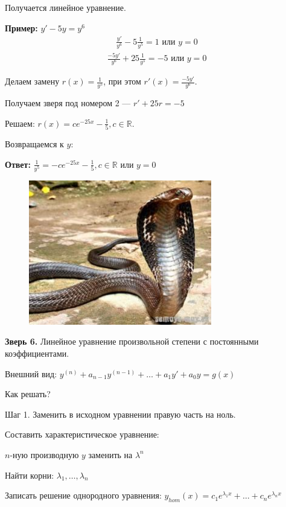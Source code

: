 \documentclass[10pt,a4paper]{article}
\begin{document}
\par Получается линейное уравнение.
\par \textbf{Пример:} $y' - 5y = y^6$
\begin{eqnarray*}
\frac{y'}{y^6} - 5 \frac{1}{y^5} = 1 \text{ или } y = 0
\end{eqnarray*}
\begin{eqnarray*}
\frac{-5y'}{y^6} + 25 \frac{1}{y^5} = -5 \text{ или } y = 0
\end{eqnarray*}
\par Делаем замену $r(x) = \frac1 {y^5}$, при этом $r'(x) = \frac{-5y'}{y^6}$.
\par Получаем зверя под номером 2 --- $r' + 25r = -5$
\par Решаем: $r(x) = ce^{-25x} - \frac 1 5, c \in \mathbb{R}$.
\par Возвращаемся к $y$:
\par \textbf{Ответ:} $\frac 1 {y^5} = -ce^{-25x} - \frac 1 5, c \in \mathbb{R} \text{ или } y = 0$ \\
\newpage
\pagecolor{LimeGreen}
\begin{figure}[h]
\centering
\includegraphics[width = 8cm]{snake.jpg}
\end{figure}
\par \textbf{Зверь 6.} Линейное уравнение произвольной степени с постоянными коэффициентами.
\par Внешний вид: $y^{(n)} + a_{n-1}y^{(n-1)} + \dots + a_1y' + a_0y = g(x)$
\par Как решать?
\par Шаг 1. Заменить в исходном уравнении правую часть на ноль.
\par Составить характеристическое уравнение:
\par $n$-ную производную $y$ заменить на $\lambda^n$
\par Найти корни: $\lambda_1, \dots, \lambda_n$
\par Записать решение однородного уравнения: $y_{hom}(x) = c_1e^{\lambda_1x} + \dots + c_ne^{\lambda_nx}$
\end{document}
